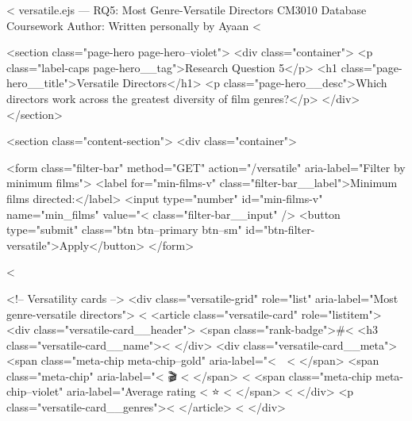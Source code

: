 <%
  versatile.ejs — RQ5: Most Genre-Versatile Directors
  CM3010 Database Coursework
  Author: Written personally by Ayaan
<%

<section class="page-hero page-hero--violet">
  <div class="container">
    <p class="label-caps page-hero__tag">Research Question 5</p>
    <h1 class="page-hero__title">Versatile Directors</h1>
    <p class="page-hero__desc">Which directors work across the greatest diversity of film genres?</p>
  </div>
</section>

<section class="content-section">
  <div class="container">

    <form class="filter-bar" method="GET" action="/versatile" aria-label="Filter by minimum films">
      <label for="min-films-v" class="filter-bar__label">Minimum films directed:</label>
      <input type="number" id="min-films-v" name="min_films"
             value="<%
             class="filter-bar__input" />
      <button type="submit" class="btn btn--primary btn--sm" id="btn-filter-versatile">Apply</button>
    </form>

    <%

    <!-- Versatility cards -->
    <div class="versatile-grid" role="list" aria-label="Most genre-versatile directors">
      <%
      <article class="versatile-card" role="listitem">
        <div class="versatile-card__header">
          <span class="rank-badge">#<%
          <h3 class="versatile-card__name"><%
        </div>
        <div class="versatile-card__meta">
          <span class="meta-chip meta-chip--gold" aria-label="<%
            🎨 <%
          </span>
          <span class="meta-chip" aria-label="<%
            🎬 <%
          </span>
          <%
          <span class="meta-chip meta-chip--violet" aria-label="Average rating <%
            ⭐ <%
          </span>
          <%
        </div>
        <p class="versatile-card__genres"><%
      </article>
      <%
    </div>

